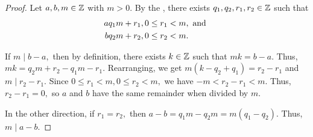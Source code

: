 \documentclass{ximera}
\begin{document}
\begin{proof}
Let $a,b,m\in\mathbb Z$ with $m> 0.$ By the , there exists $q_1,q_2,r_1,r_2\in\mathbb Z$ such that \begin{align*}
                    a & q_1 m +r_1, 0\leq r_1< m, \textnormal{ and }\\
                    b & q_2 m +r_2, 0\leq r_2< m.
                \end{align*}
            
            
                If $m\mid b-a,$ then by definition, there exists $k\in\mathbb Z$ such that $mk=b-a.$ Thus, $mk=q_2 m+r_2-q_1 m-r_1.$ Rearranging, we get 
                $m(k-q_2+q_1)=r_2-r_1$ and $m\mid r_2-r_1.$ Since 
                $0\leq r_1< m, 0\leq r_2< m,$ we have 
                $-m< r_2-r_1< m.$ Thus, $r_2-r_1=0,$ so $a$ and $b$ have the same remainder when divided by $m$.
            

            
                In the other direction, if $r_1=r_2,$ then $a-b=q_1 m-q_2 m=m(q_1-q_2).$ Thus, $m\mid a-b.$
\end{proof}
\end{document}
